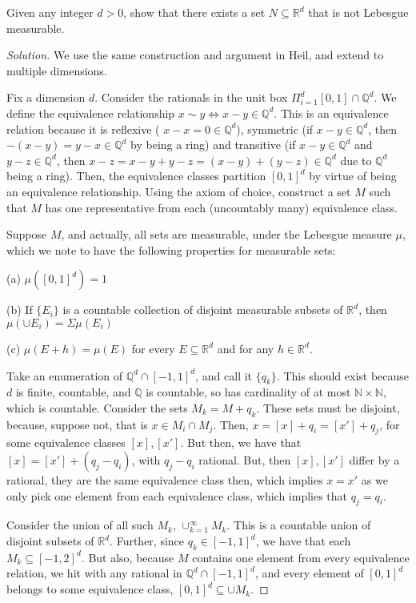 \documentclass[10pt]{article}
\newenvironment{problem}[2][Problem]{\begin{trivlist}
\item[\hskip \labelsep {\bfseries #1}\hskip \labelsep {\bfseries #2.}]}{\end{trivlist}}
\begin{document}
\begin{problem}{2.4.10}
Given any integer $d > 0$, show that there exists a set $N \subseteq \mathbb{R}^d$ that is not Lebesgue measurable.
\end{problem}
\begin{proof}[Solution]
We use the same construction and argument in Heil, and extend to multiple dimensions.

Fix a dimension $d$. Consider the rationals in the unit box $\Pi_{i=1}^d [0,1] \cap \mathbb{Q}^d$. We define the equivalence relationship $x \sim y \iff x -y \in \mathbb{Q}^d$. This is an equivalence relation because it is reflexive ( $ x - x = 0 \in \mathbb{Q}^d$), symmetric (if $x-y \in \mathbb{Q}^d$, then $-(x-y) = y-x \in \mathbb{Q}^d$ by being a ring) and transitive (if $x-y \in \mathbb{Q}^d$ and $y - z \in \mathbb{Q}^d$, then $x - z = x - y + y - z = (x-y) + (y-z) \in \mathbb{Q}^d$ due to $\mathbb{Q}^d$ being a ring). Then, the equivalence classes partition $[0,1]^d$ by virtue of being an equivalence relationship. Using the axiom of choice, construct a set $M$ such that $M$ has one representative from each (uncountably many) equivalence class.

Suppose $M$, and actually, all sets are measurable, under the Lebesgue measure $\mu$, which we note to have the following properties for measurable sets:

(a) $\mu([0,1]^d) = 1$

(b) If $\{ E_i \}$ is a countable collection of disjoint measurable subsets of $\mathbb{R}^d$, then $\mu(\cup E_i) = \Sigma \mu(E_i)$

(c) $\mu (E + h) = \mu(E)$ for every $E \subseteq \mathbb{R}^d$ and for any $h \in \mathbb{R}^d$.

Take an enumeration of $\mathbb{Q}^d \cap [-1,1]^d$, and call it $\{ q_k \}$. This should exist because $d$ is finite, countable, and $\mathbb{Q}$ is countable, so has cardinality of at most $\mathbb{N} \times \mathbb{N}$, which is countable. Consider the sets $M_k = M + q_k$. These sets must be disjoint, because, suppose not, that is $x \in M_i \cap M_j$. Then, $x = [x] + q_i = [x'] + q_j$, for some equivalence classes $[x], [x']$. But then, we have that $[x] = [x'] + (q_j - q_i)$, with $q_j - q_i$ rational. But, then $[x],[x']$ differ by a rational, they are the same equivalence class then, which implies $x = x'$ as we only pick one element from each equivalence class, which implies that $q_j = q_i$.

Consider the union of all such $M_k$, $\cup_{k=1}^\infty M_k$. This is a countable union of disjoint subsets of $\mathbb{R}^d$. Further, since $q_k \in [-1,1]^d$, we have that each $M_k \subseteq [-1,2]^d$. But also, because $M$ contains one element from every equivalence relation, we hit with any rational in $\mathbb{Q}^d \cap [-1,1]^d$, and every element of $[0,1]^d$ belongs to some equivalence class, $[0,1]^d \subseteq \cup M_k$.


\end{proof}
\end{document}
